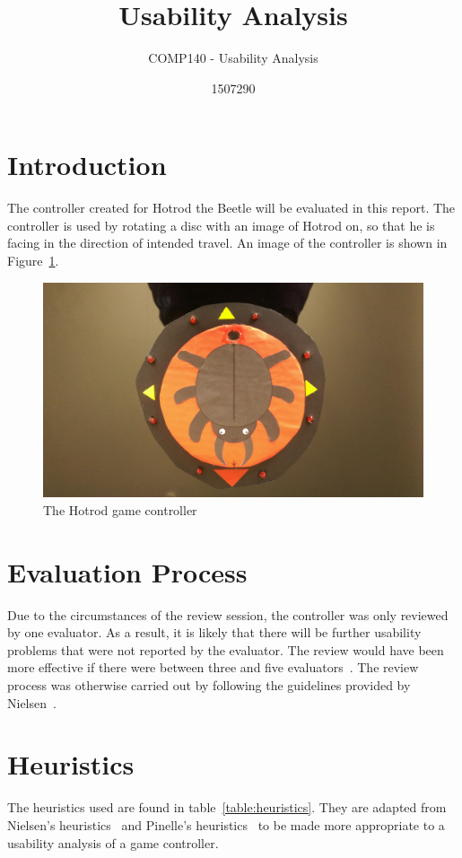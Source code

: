 \documentclass{scrartcl}
\title{Usability Analysis}
\subtitle{COMP140 - Usability Analysis}
\author{1507290}
\begin{document}
\maketitle

\abstract{}

\section{Introduction}
The controller created for Hotrod the Beetle will be evaluated in this report. The controller is used by rotating a disc with an image of Hotrod on, so that he is facing in the direction of intended travel. An image of the controller is shown in Figure~\ref{fig:controller}.
\begin{figure}[h]
\includegraphics[width=\textwidth]{controller.jpg}
\caption{The Hotrod game controller}
\label{fig:controller}
\end{figure} 

\section{Evaluation Process}
Due to the circumstances of the review session, the controller was only reviewed by one evaluator. As a result, it is likely that there will be further usability problems that were not reported by the evaluator. The review would have been more effective if there were between three and five evaluators~\cite{nielsen:evaluation}. The review process was otherwise carried out by following the guidelines provided by Nielsen~\cite{nielsen:how}.

\section{Heuristics}
The heuristics used are found in table~\ref{table:heuristics}. They are adapted from Nielsen's heuristics~\cite{nielsen:heuristics} and Pinelle's heuristics~\cite{pinelle:heuristic} to be made more appropriate to a usability analysis of a game controller.
\end{document}
